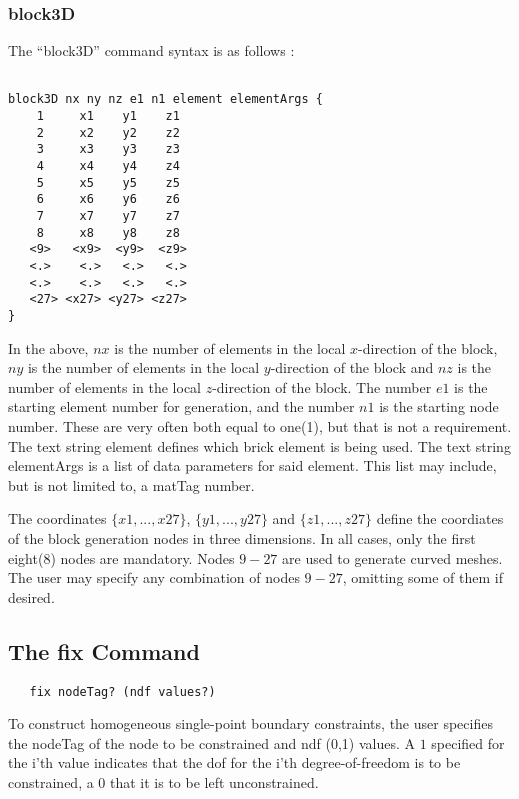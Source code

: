 \documentclass[12pt]{article}
\begin{document}
\subsubsection{block3D}
The ``block3D'' command syntax is as follows :
{\sf\small
\begin{verbatim}

block3D nx ny nz e1 n1 element elementArgs {
    1     x1    y1    z1 
    2     x2    y2    z2 
    3     x3    y3    z3 
    4     x4    y4    z4 
    5     x5    y5    z5 
    6     x6    y6    z6 
    7     x7    y7    z7 
    8     x8    y8    z8 
   <9>   <x9>  <y9>  <z9>   
   <.>    <.>   <.>   <.>
   <.>    <.>   <.>   <.>
   <27> <x27> <y27> <z27>
}
\end{verbatim}

}
In the above, $nx$ is the number of elements in the local $x$-direction of
the block,
$ny$ is the number of elements in the local $y$-direction of
the block and
$nz$ is the number of elements in the local $z$-direction of
the block.
The number $e1$ is the starting element number for generation, and 
the number $n1$ is the starting node number.  These are very often both equal to 
one(1), but that is not a requirement.  The text string \p element defines 
which brick element is being used.  The text string \p elementArgs
is a list of data parameters for said element.  This list may include, but is
not limited to, a matTag number.

The coordinates $\{x1,...,x27\}$, $\{y1,...,y27\}$ and $\{z1,...,z27\}$
define the coordiates
of the block generation nodes in three dimensions.  
In all cases, only the first eight(8) 
nodes are mandatory. Nodes $9-27$ are used to generate curved meshes.
The user may specify any combination of nodes $9-27$, omitting some of them
if desired.




\subsection{The fix Command}
{\sf\small
\begin{verbatim}
   fix nodeTag? (ndf values?)
\end{verbatim}
}

To construct homogeneous single-point boundary constraints, the user
specifies the nodeTag of the node to be constrained and ndf (0,1)
values. A $1$ specified for the i'th value indicates that the dof for
the i'th degree-of-freedom is to be constrained, a $0$ that it is to be
left unconstrained.
\end{document}
